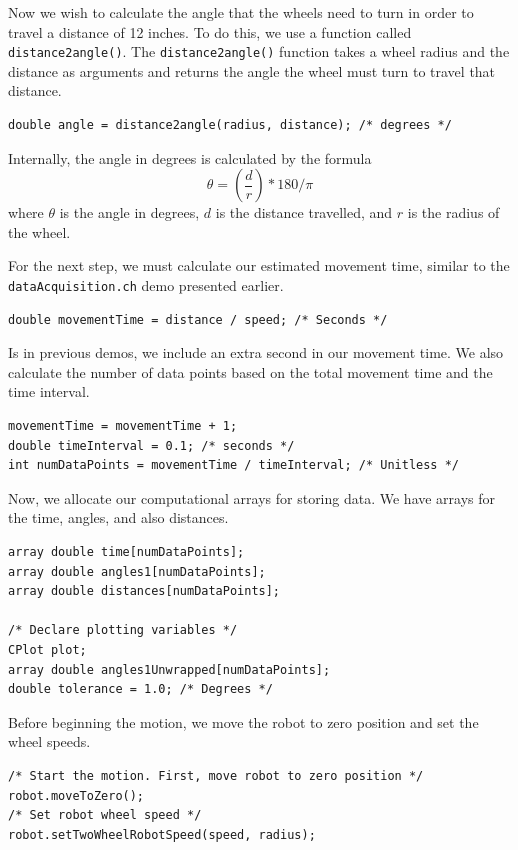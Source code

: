 \documentclass{article}
\begin{document}
Now we wish to calculate the angle that the wheels need to turn in order to
travel a distance of 12 inches. To do this, we use a function called
\texttt{distance2angle()}. The \texttt{distance2angle()} function 
takes a wheel radius and the distance as arguments and returns the angle
the wheel must turn to travel that distance. 
\begin{verbatim}
double angle = distance2angle(radius, distance); /* degrees */
\end{verbatim}

Internally, the angle in degrees is calculated by the formula
\begin{equation*}
\theta  = \left(\frac{d}{r} \right) * 180 / \pi
\end{equation*}
where $\theta$ is the angle in degrees, $d$ is the distance travelled, 
and $r$ is the radius of the wheel.

For the next step, we must calculate our estimated movement time, similar to the
\texttt{dataAcquisition.ch} demo presented earlier. 
\begin{verbatim}
double movementTime = distance / speed; /* Seconds */
\end{verbatim}

Is in previous demos, we include an extra second in our movement time. We
also calculate the number of data points based on the total movement time
and the time interval.
\begin{verbatim}
movementTime = movementTime + 1; 
double timeInterval = 0.1; /* seconds */
int numDataPoints = movementTime / timeInterval; /* Unitless */
\end{verbatim}

Now, we allocate our computational arrays for storing data. We have arrays 
for the time, angles, and also distances.
\begin{verbatim}
array double time[numDataPoints];
array double angles1[numDataPoints];
array double distances[numDataPoints];

/* Declare plotting variables */
CPlot plot;
array double angles1Unwrapped[numDataPoints];
double tolerance = 1.0; /* Degrees */
\end{verbatim}

Before beginning the motion, we move the robot to zero position and set the 
wheel speeds.
\begin{verbatim}
/* Start the motion. First, move robot to zero position */
robot.moveToZero();
/* Set robot wheel speed */
robot.setTwoWheelRobotSpeed(speed, radius);
\end{verbatim}
\end{document}
